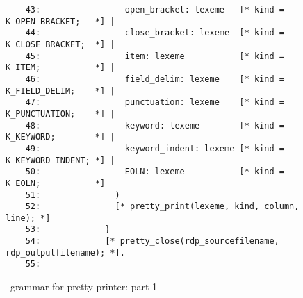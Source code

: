 \begin{figure}
\begin{minipage}{30cm}
\begin{verbatim}
    43:                 open_bracket: lexeme   [* kind = K_OPEN_BRACKET;   *] |
    44:                 close_bracket: lexeme  [* kind = K_CLOSE_BRACKET;  *] |
    45:                 item: lexeme           [* kind = K_ITEM;           *] |
    46:                 field_delim: lexeme    [* kind = K_FIELD_DELIM;    *] |
    47:                 punctuation: lexeme    [* kind = K_PUNCTUATION;    *] |
    48:                 keyword: lexeme        [* kind = K_KEYWORD;        *] |
    49:                 keyword_indent: lexeme [* kind = K_KEYWORD_INDENT; *] |
    50:                 EOLN: lexeme           [* kind = K_EOLN;           *]
    51:               )
    52:               [* pretty_print(lexeme, kind, column, line); *]
    53:             }
    54:             [* pretty_close(rdp_sourcefilename, rdp_outputfilename); *].
    55: 
\end{verbatim}
\end{minipage}
\caption{\rdp\ grammar for pretty-printer: part 1}
\label{pretty_c.bnf:1}
\end{figure}
